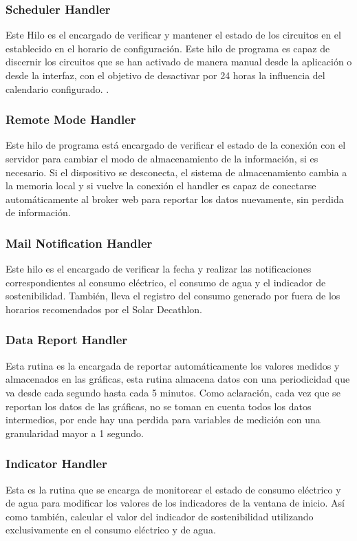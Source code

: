 \subsubsection{Scheduler Handler}
Este Hilo es el encargado de verificar y mantener el estado de los circuitos en el establecido en el horario de configuración. Este hilo de programa es capaz de discernir los circuitos que se han activado de manera manual desde la aplicación o desde la interfaz, con el objetivo de desactivar por 24 horas la influencia del calendario configurado.
.
\subsubsection{Remote Mode Handler}
Este hilo de programa está encargado de verificar el estado de la conexión con el servidor para cambiar el modo de almacenamiento de la información, si es necesario. Si el dispositivo se desconecta, el sistema de almacenamiento cambia a la memoria local y si vuelve la conexión el handler es capaz de conectarse automáticamente al broker web para reportar los datos nuevamente, sin perdida de información.

\subsubsection{Mail Notification Handler}

Este hilo es el encargado de verificar la fecha y realizar las notificaciones correspondientes al consumo eléctrico, el consumo de agua y el indicador de sostenibilidad. También, lleva el registro del consumo generado por fuera de los horarios recomendados por el Solar Decathlon.

\subsubsection{Data Report Handler}

Esta rutina es la encargada de reportar automáticamente los valores medidos y almacenados en las gráficas, esta rutina almacena datos con una periodicidad que va desde  cada segundo hasta cada 5 minutos. Como aclaración, cada vez que se reportan los datos de las gráficas, no se toman en cuenta todos los datos intermedios, por ende hay una perdida para variables de medición con una granularidad mayor a 1 segundo.

\subsubsection{Indicator Handler}

Esta es la rutina que se encarga de monitorear el estado de consumo eléctrico y de agua para modificar los valores de los indicadores de la ventana de inicio. Así como también, calcular el valor del indicador de sostenibilidad utilizando exclusivamente en el consumo eléctrico y de agua.


 
